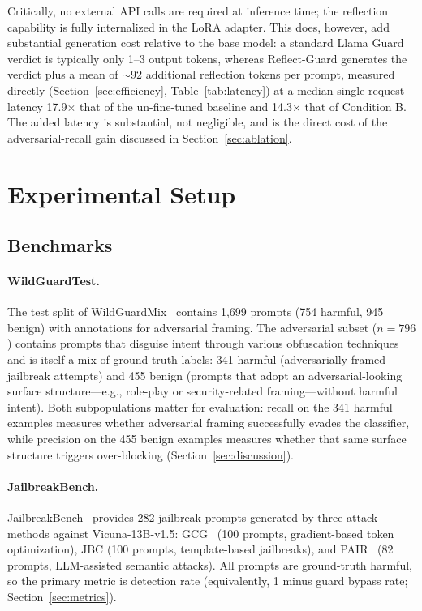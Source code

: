 \documentclass[Superintelligence,article,submit,pdftex,moreauthors]{Definitions/mdpi}
\begin{document}
Critically, no external API calls are required at inference time; the reflection capability is fully internalized in the LoRA adapter. This does, however, add substantial generation cost relative to the base model: a standard Llama Guard verdict is typically only 1--3 output tokens, whereas Reflect-Guard generates the verdict plus a mean of $\sim$92 additional reflection tokens per prompt, measured directly (Section~\ref{sec:efficiency}, Table~\ref{tab:latency}) at a median single-request latency 17.9$\times$ that of the un-fine-tuned baseline and 14.3$\times$ that of Condition B. The added latency is substantial, not negligible, and is the direct cost of the adversarial-recall gain discussed in Section~\ref{sec:ablation}.

\section{Experimental Setup}

\subsection{Benchmarks}
\label{sec:benchmarks}

\paragraph{WildGuardTest.} The test split of WildGuardMix~\citep{han2024wildguard} contains 1{,}699 prompts (754 harmful, 945 benign) with annotations for adversarial framing. The adversarial subset ($n = 796$) contains prompts that disguise intent through various obfuscation techniques and is itself a mix of ground-truth labels: 341 harmful (adversarially-framed jailbreak attempts) and 455 benign (prompts that adopt an adversarial-looking surface structure---e.g., role-play or security-related framing---without harmful intent). Both subpopulations matter for evaluation: recall on the 341 harmful examples measures whether adversarial framing successfully evades the classifier, while precision on the 455 benign examples measures whether that same surface structure triggers over-blocking (Section~\ref{sec:discussion}).

\paragraph{JailbreakBench.} JailbreakBench~\citep{chao2024jailbreakbench} provides 282 jailbreak prompts generated by three attack methods against Vicuna-13B-v1.5: GCG~\citep{zou2023universal} (100 prompts, gradient-based token optimization), JBC (100 prompts, template-based jailbreaks), and PAIR~\citep{chao2023jailbreaking} (82 prompts, LLM-assisted semantic attacks). All prompts are ground-truth harmful, so the primary metric is detection rate (equivalently, 1 minus guard bypass rate; Section~\ref{sec:metrics}).
\end{document}
